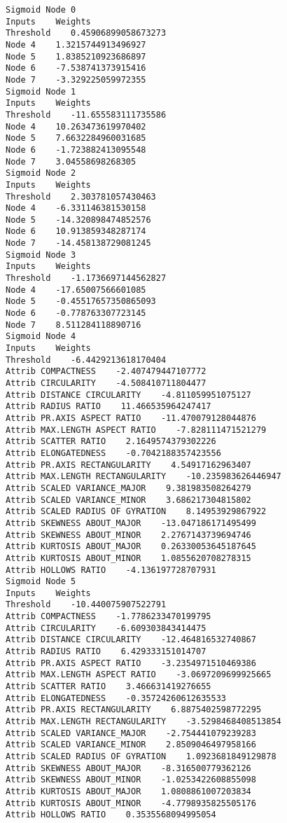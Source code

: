 \documentclass[
	article,			%
	11pt,				%
	oneside,			%
	a4paper,			%
	english,			%
	brazil,				%
	sumario=tradicional
	]{abntex2}
\begin{document}
\begin{lstlisting}
Sigmoid Node 0
Inputs    Weights
Threshold    0.45906899058673273
Node 4    1.3215744913496927
Node 5    1.8385210923686897
Node 6    -7.538741373915416
Node 7    -3.329225059972355
Sigmoid Node 1
Inputs    Weights
Threshold    -11.655583111735586
Node 4    10.263473619970402
Node 5    7.6632284960031685
Node 6    -1.723882413095548
Node 7    3.04558698268305
Sigmoid Node 2
Inputs    Weights
Threshold    2.303781057430463
Node 4    -6.331146381530158
Node 5    -14.320898474852576
Node 6    10.913859348287174
Node 7    -14.458138729081245
Sigmoid Node 3
Inputs    Weights
Threshold    -1.1736697144562827
Node 4    -17.65007566601085
Node 5    -0.45517657350865093
Node 6    -0.778763307723145
Node 7    8.511284118890716
Sigmoid Node 4
Inputs    Weights
Threshold    -6.4429213618170404
Attrib COMPACTNESS    -2.407479447107772
Attrib CIRCULARITY    -4.508410711804477
Attrib DISTANCE CIRCULARITY    -4.811059951075127
Attrib RADIUS RATIO    11.466535964247417
Attrib PR.AXIS ASPECT RATIO    -11.470079128044876
Attrib MAX.LENGTH ASPECT RATIO    -7.828111471521279
Attrib SCATTER RATIO    2.1649574379302226
Attrib ELONGATEDNESS    -0.7042188357423556
Attrib PR.AXIS RECTANGULARITY    4.54917162963407
Attrib MAX.LENGTH RECTANGULARITY    -10.235983626446947
Attrib SCALED VARIANCE_MAJOR    9.381983508264279
Attrib SCALED VARIANCE_MINOR    3.686217304815802
Attrib SCALED RADIUS OF GYRATION    8.14953929867922
Attrib SKEWNESS ABOUT_MAJOR    -13.047186171495499
Attrib SKEWNESS ABOUT_MINOR    2.2767143739694746
Attrib KURTOSIS ABOUT_MAJOR    0.26330053645187645
Attrib KURTOSIS ABOUT_MINOR    1.0855620708278315
Attrib HOLLOWS RATIO    -4.136197728707931
Sigmoid Node 5
Inputs    Weights
Threshold    -10.440075907522791
Attrib COMPACTNESS    -1.7786233470199795
Attrib CIRCULARITY    -6.609303843414475
Attrib DISTANCE CIRCULARITY    -12.464816532740867
Attrib RADIUS RATIO    6.429333151014707
Attrib PR.AXIS ASPECT RATIO    -3.2354971510469386
Attrib MAX.LENGTH ASPECT RATIO    -3.0697209699925665
Attrib SCATTER RATIO    3.466631419276655
Attrib ELONGATEDNESS    -0.35724260612635533
Attrib PR.AXIS RECTANGULARITY    6.8875402598772295
Attrib MAX.LENGTH RECTANGULARITY    -3.5298468408513854
Attrib SCALED VARIANCE_MAJOR    -2.754441079239283
Attrib SCALED VARIANCE_MINOR    2.8509046497958166
Attrib SCALED RADIUS OF GYRATION    1.0923681849129878
Attrib SKEWNESS ABOUT_MAJOR    -8.316500779362126
Attrib SKEWNESS ABOUT_MINOR    -1.0253422608855098
Attrib KURTOSIS ABOUT_MAJOR    1.0808861007203834
Attrib KURTOSIS ABOUT_MINOR    -4.7798935825505176
Attrib HOLLOWS RATIO    0.3535568094995054

\end{lstlisting}
\end{document}
